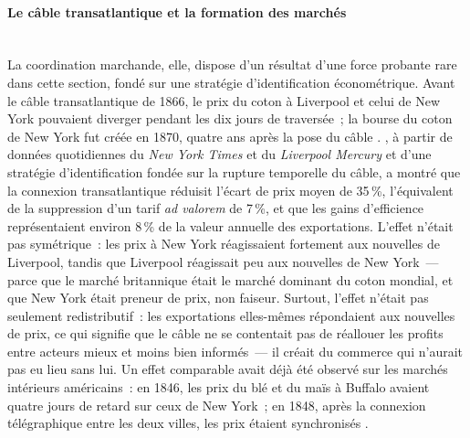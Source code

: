 \paragraph{Le câble transatlantique et la formation des marchés}\mbox{}\\
La coordination marchande, elle, dispose d'un résultat d'une force probante rare dans cette section, fondé sur une stratégie d'identification économétrique. Avant le câble transatlantique de 1866, le prix du coton à Liverpool et celui de New York pouvaient diverger pendant les dix jours de traversée~; la bourse du coton de New York fut créée en 1870, quatre ans après la pose du câble \parencite{standage1998victorian, gordon_thread_2002}. \textcite{steinwender_real_2018}, à partir de données quotidiennes du \emph{New York Times} et du \emph{Liverpool Mercury} et d'une stratégie d'identification fondée sur la rupture temporelle du câble, a montré que la connexion transatlantique réduisit l'écart de prix moyen de 35\,\%, l'équivalent de la suppression d'un tarif \emph{ad valorem} de 7\,\%, et que les gains d'efficience représentaient environ 8\,\% de la valeur annuelle des exportations. L'effet n'était pas symétrique~: les prix à New York réagissaient fortement aux nouvelles de Liverpool, tandis que Liverpool réagissait peu aux nouvelles de New York~--- parce que le marché britannique était le marché dominant du coton mondial, et que New York était preneur de prix, non faiseur. Surtout, l'effet n'était pas seulement redistributif~: les exportations elles-mêmes répondaient aux nouvelles de prix, ce qui signifie que le câble ne se contentait pas de réallouer les profits entre acteurs mieux et moins bien informés~--- %
il créait du commerce qui n'aurait pas eu lieu sans lui. Un effet comparable avait déjà été observé sur les marchés intérieurs américains~: en 1846, les prix du blé et du maïs à Buffalo avaient quatre jours de retard sur ceux de New York~; en 1848, après la connexion télégraphique entre les deux villes, les prix étaient synchronisés \parencite{nonnenmacher_telegraph_2001}.

